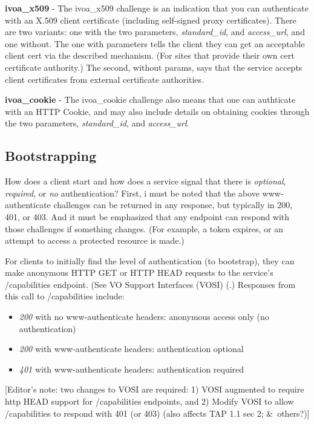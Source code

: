 \documentclass[11pt,a4paper]{ivoa}
\begin{document}
\textbf{ivoa\_x509} - The ivoa\_x509 challenge is an indication that you
can authenticate with an X.509 client certificate (including self-signed
proxy certificates). There are two variants: one with the two
parameters, \emph{standard\_id}, and \emph{access\_url}, and one without. The
one with parameters tells the client they can get an acceptable client
cert via the described mechanism. (For sites that provide their own cert
certificate authority.) The second, without params, says that the
service accepts client certificates from external certificate
authorities.

\textbf{ivoa\_cookie} - The ivoa\_cookie challenge also means that one can
authticate with an HTTP Cookie, and may also include details on
obtaining cookies through the two parameters, \emph{standard\_id}, and
\emph{access\_url}.

\subsection{Bootstrapping}

How does a client start and how does a service signal that there is
\emph{optional}, \emph{required}, or \emph{no} authentication? First, i
 must be noted that the above www-authenticate challenges can be
 returned in any response, but typically in 200, 401, or 403. And it
 must be emphasized that any endpoint can respond with those challenges
 if something changes. (For example, a token expires, or an attempt to
 access a protected resource is made.)

For clients to initially find the level of authentication (to
bootstrap), they can make anonymous HTTP GET or HTTP HEAD requests to
the service's /capabilities endpoint. (See VO Support Interfaces (VOSI)
(\citep{2017ivoa.spec.0524G}.) Responses from this call to /capabilities
include:

\begin{itemize}
\item{\emph{200}} with no www-authenticate headers: anonymous access only (no authentication)
\item{\emph{200}} with www-authenticate headers: authentication optional
\item{\emph{401}} with www-authenticate headers: authentication required
\end{itemize}

[Editor's note: two changes to VOSI are required: 1) VOSI augmented to
require http HEAD support for /capabilities endpoints, and 2) Modify
VOSI to allow /capabilities to respond with 401 (or 403) (also affects
TAP 1.1 sec 2; \&\ others?)]
\end{document}
